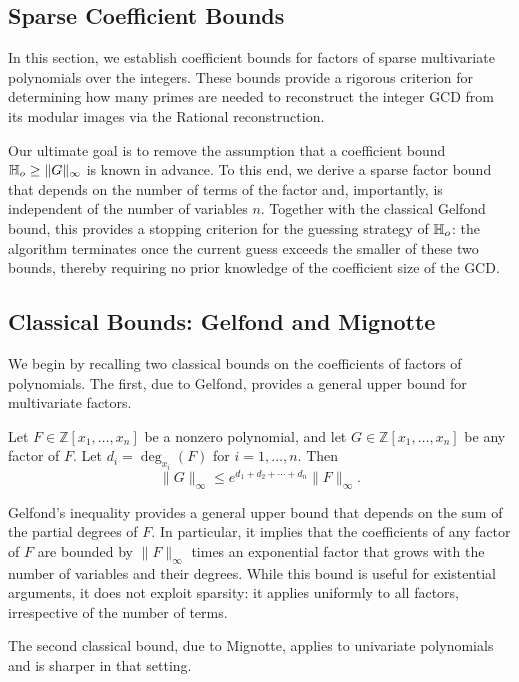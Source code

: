 \documentclass{article}
\numberwithin{equation}{section}
\begin{document}
\subsection{Sparse Coefficient Bounds}
\label{sec:coeff-bounds}

In this section, we establish coefficient bounds for factors of sparse multivariate polynomials over the integers. These bounds provide a rigorous criterion for determining how many primes are needed to reconstruct the integer GCD from its modular images via the Rational reconstruction. 

Our ultimate goal is to remove the assumption that a coefficient bound $\mathbb{H}_{o} \ge \|G\|_\infty$ is known in advance. To this end, we derive a sparse factor bound that depends on the number of terms of the factor and, importantly, is independent of the number of variables $n$. Together with the classical Gelfond bound, this provides a stopping criterion for the guessing strategy of $\mathbb{H}_{o}$: the algorithm terminates once the current guess exceeds the smaller of these two bounds, thereby requiring no prior knowledge of the coefficient size of the GCD.


\subsection*{Classical Bounds: Gelfond and Mignotte}

We begin by recalling two classical bounds on the coefficients of factors of polynomials. The first, due to Gelfond, provides a general upper bound for multivariate factors.

\begin{theorem}
Let $F \in \mathbb{Z}[x_1,\dots,x_n]$ be a nonzero polynomial, and let $G \in \mathbb{Z}[x_1,\dots,x_n]$ be any factor of $F$. Let $d_i = \deg_{x_i}(F)$ for $i = 1,\dots,n$. Then
\[
\|G\|_\infty \le e^{d_1 + d_2 + \cdots + d_n} \|F\|_\infty.
\]
\end{theorem}

Gelfond's inequality provides a general upper bound that depends on the sum of the partial degrees of $F$. In particular, it implies that the coefficients of any factor of $F$ are bounded by $\|F\|_\infty$ times an exponential factor that grows with the number of variables and their degrees. While this bound is useful for existential arguments, it does not exploit sparsity: it applies uniformly to all factors, irrespective of the number of terms.

The second classical bound, due to Mignotte, applies to univariate polynomials and is sharper in that setting.
\end{document}
